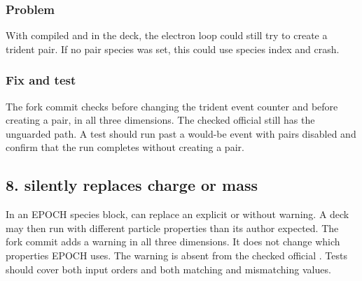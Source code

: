 \subsubsection*{Problem}
With  compiled and
 in the deck, the electron loop could
still try to create a trident pair. If no pair species was set,
this could use species index  and crash.

\subsubsection*{Fix and test}
The fork commit  checks
 before changing the trident event counter
and before creating a pair, in all three dimensions.
The checked official  still has the unguarded path.
A test should run past a would-be event with pairs disabled and
confirm that the run completes without creating a pair.

\subsection*{8.  silently replaces charge or mass}
\label{bug:8}
In an EPOCH species block,  can replace an
explicit  or  without warning. A deck
may then run with different particle properties than its
author expected. The fork commit 
adds a warning in all three dimensions. It does not change
which properties EPOCH uses. The warning is absent from the
checked official . Tests should cover both input
orders and both matching and mismatching values.
